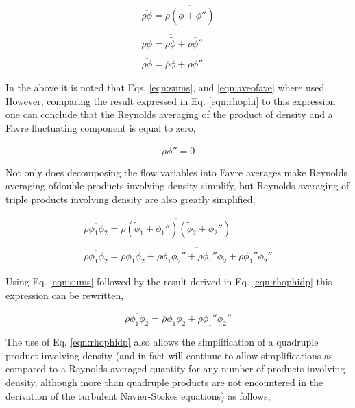 \begin{displaymath}
	\begin{array}{c}
		\overline{\rho \phi} = \overline{\rho (\tilde{\phi} + \phi'')} \\ \\
		\overline{\rho \phi} = \overline{\rho \tilde{\phi}} + \overline{\rho \phi''} \\ \\
		\overline{\rho \phi} = \overline{\rho} \tilde{\phi} + \overline{\rho \phi''}
	\end{array}
\end{displaymath}

	In the above it is noted that Eqs. \ref{eqn:sums}, and \ref{eqn:aveofave} where used.
However, comparing the result expressed in Eq. \ref{eqn:rhophi} to this expression one can conclude that 
the Reynolds averaging of the product of density and a Favre fluctuating component is equal to zero,

\begin{equation}
	\overline{\rho \phi''} = 0
\label{eqn:rhophidp}
\end{equation}

	Not only does decomposing the flow variables into Favre averages make Reynolds averaging ofdouble products 
involving density simplify, but Reynolds averaging of triple products involving density are also greatly simplified,

\begin{displaymath}
	\begin{array}{c}
		\overline{\rho \phi_1 \phi_2} = \overline{\rho (\tilde{\phi}_1 + \phi_1'') 
		(\tilde{\phi}_2 + \phi_2'')} \\ \\
		\overline{\rho \phi_1 \phi_2} = \overline{\rho \tilde{\phi}_1 \tilde{\phi}_2 + 
		\rho \tilde{\phi}_1\phi_2'' + \rho \phi_1'' \tilde{\phi}_2 + \rho \phi_1'' \phi_2'' }
	\end{array}
\end{displaymath}

	Using Eq. \ref{eqn:sums} followed by the result derived in Eq. \ref{eqn:rhophidp} this expression
can be rewritten,

\begin{equation}
	\overline{\rho \phi_1 \phi_2} = \overline{\rho}\tilde\phi_1 \tilde\phi_2 + 
	\overline{\rho \phi_1'' \phi_2''}	
\label{eqn:tripleprod}
\end{equation}

	The use of Eq. \ref{eqn:rhophidp} also allows the simplification of a quadruple product involving density (and in
fact will continue to allow simplifications as compared to a Reynolds averaged quantity for any number
of products involving density, although more than quadruple products are not encountered in the derivation
of the turbulent Navier-Stokes equations) as follows,


